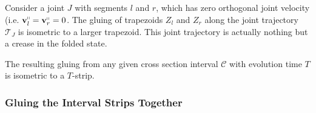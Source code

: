 
\begin{lemma}
\label{lem:trapezoid_gluing_parallel}
Consider a joint $J$ with segments $l$ and $r$, which has zero orthogonal joint velocity (i.e. $\vec v_l^\shortparallel = \vec v_r^\shortparallel = 0$.
The gluing of trapezoids $Z_l$ and $Z_r$ along the joint trajectory $\mathcal T_J$ is isometric to a larger trapezoid.
This joint trajectory is actually nothing but a crease in the folded state.
\end{lemma}

\begin{lemma}
\label{lem:trapezoid_gluing}

\end{lemma}


\begin{theorem}
\label{thm:cross_section_interval_strip}
The resulting gluing from any given cross section interval $\mathcal C$ with evolution time $T$ is isometric to a $T$-strip.
\end{theorem}


\subsubsection{Gluing the Interval Strips Together}
\label{sec:interval_strip_gluing}



